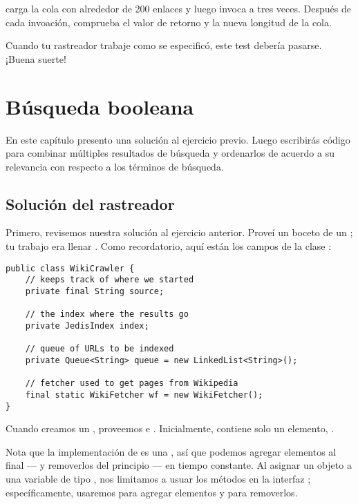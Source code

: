 \documentclass[12pt]{book}
\theoremstyle{exercise}
\begin{document}
 carga la cola con alrededor de 200 enlaces y luego
invoca a  tres veces. Después de cada invoación, comprueba el
valor de retorno y la nueva longitud de la cola.

Cuando tu rastreador trabaje como se especificó, este test debería pasarse.
¡Buena suerte!



\chapter{Búsqueda booleana}

En este capítulo presento una solución al ejercicio previo. Luego escribirás
código para combinar múltiples resultados de búsqueda y ordenarlos de acuerdo
a su relevancia con respecto a los términos de búsqueda.


\section{Solución del rastreador}
\label{crawler-solution}

Primero, revisemos nuestra solución al ejercicio anterior. Proveí un
boceto de un ; tu trabajo era llenar .
Como recordatorio, aquí están los campos de la clase :


\begin{verbatim}
public class WikiCrawler {
    // keeps track of where we started
    private final String source;

    // the index where the results go
    private JedisIndex index;

    // queue of URLs to be indexed
    private Queue<String> queue = new LinkedList<String>();

    // fetcher used to get pages from Wikipedia
    final static WikiFetcher wf = new WikiFetcher();
}
\end{verbatim}

Cuando creamos un , proveemos  e
. Inicialmente,  contiene solo un elemento,
.


Nota que la implementación de  es una
, así que podemos agregar elementos al final --- y 
removerlos del principio --- en tiempo constante. Al asignar un objeto
 a una variable de tipo , nos limitamos a
usuar los métodos en la interfaz ; específicamente,
usaremos  para agregar elementos y  para
removerlos.
\end{document}
